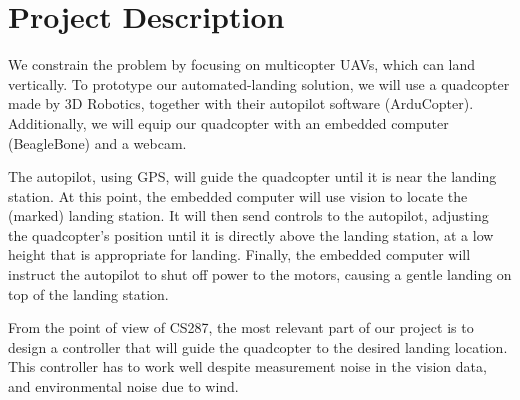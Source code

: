 \section*{Project Description}

We constrain the problem by focusing on multicopter UAVs, which can land
vertically. To prototype our automated-landing solution, we will use a
quadcopter made by 3D Robotics, together with their autopilot software
(ArduCopter). Additionally, we will equip our quadcopter with an embedded
computer (BeagleBone) and a webcam.

The autopilot, using GPS, will guide the quadcopter until it is near the
landing station. At this point, the embedded computer will use vision to locate
the (marked) landing station. It will then send controls to the autopilot,
adjusting the quadcopter's position until it is directly above the landing
station, at a low height that is appropriate for landing. Finally, the embedded
computer will instruct the autopilot to shut off power to the motors, causing a
gentle landing on top of the landing station.

From the point of view of CS287, the most relevant part of our project is to
design a controller that will guide the quadcopter to the desired landing
location. This controller has to work well despite measurement noise in the
vision data, and environmental noise due to wind.
